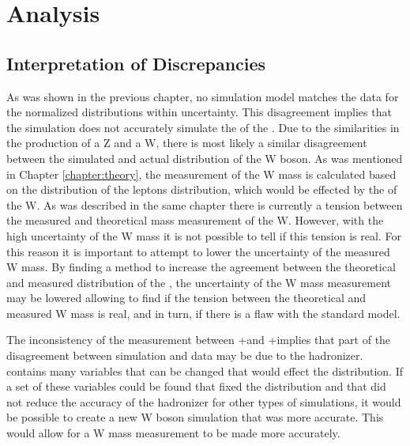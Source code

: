 \chapter{Analysis}
\label{Chapter:analysis}





\section{Interpretation of Discrepancies}
As was shown in the previous chapter, no simulation model matches the data for the normalized distributions within uncertainty. This disagreement implies that the simulation does not accurately simulate the \bosonpt of the \Z. Due to the similarities in the production of a Z and a W, there is most likely a similar disagreement between the simulated and actual \bosonpt distribution of the W boson. As was mentioned in Chapter \ref{chapter:theory}, the measurement of the W mass is calculated based on the distribution of the leptons \pt distribution, which would be effected by the \bosonpt of the W. As was described in  the same chapter there is currently a tension between the measured and theoretical mass measurement of the W. However, with the high uncertainty of the W mass it is not possible to tell if this tension is real. For this reason it is important to attempt to lower the uncertainty of the measured W mass.  By finding a method to increase the agreement between the theoretical and measured \phistar distribution of the \Z, the uncertainty of the W mass measurement may be lowered allowing to find if the tension between the theoretical and measured W mass is real, and in turn, if there is a flaw with the standard model.

The inconsistency of the \phistar measurement between \POWHEG+\PYTHIAsix and \POWHEG+\PYTHIAeight implies that part of the disagreement between simulation and data may be due to the hadronizer. \PYTHIAeight contains many variables that can be changed that would effect the \phistar distribution. If a set of these variables could be found that fixed the \phistar distribution and that did not reduce the accuracy of the hadronizer for other types of simulations, it would be possible to create a new W boson simulation that was more accurate. This would allow for a W mass measurement to be made more accurately.


